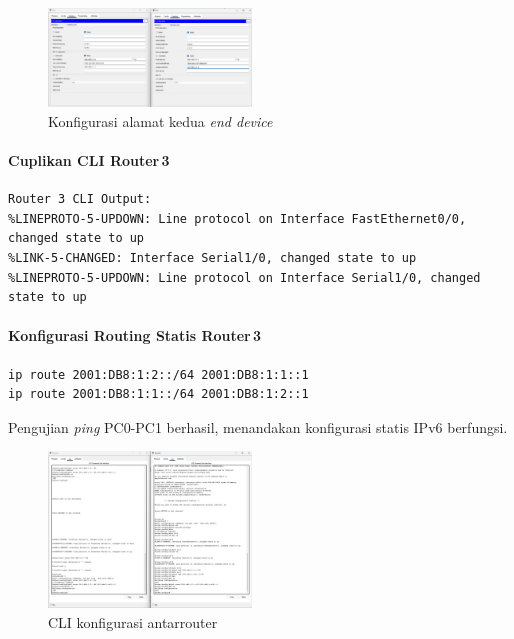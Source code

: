 \begin{figure}[H]
    \centering
    \includegraphics[width=0.48\textwidth]{img/TM2.jpeg}
    \caption{Konfigurasi alamat kedua \textit{end device}}
    \label{fig:tm2}
\end{figure}

\paragraph{Cuplikan CLI Router\,3}
\begin{verbatim}
Router 3 CLI Output:
%LINEPROTO-5-UPDOWN: Line protocol on Interface FastEthernet0/0, changed state to up
%LINK-5-CHANGED: Interface Serial1/0, changed state to up
%LINEPROTO-5-UPDOWN: Line protocol on Interface Serial1/0, changed state to up
\end{verbatim}

\paragraph{Konfigurasi Routing Statis Router\,3}
\begin{verbatim}
ip route 2001:DB8:1:2::/64 2001:DB8:1:1::1
ip route 2001:DB8:1:1::/64 2001:DB8:1:2::1
\end{verbatim}

Pengujian \textit{ping} PC0-PC1 berhasil, menandakan konfigurasi statis IPv6 berfungsi.

\begin{figure}[H]
    \centering
    \includegraphics[width=0.48\textwidth]{img/TM3.jpeg}
    \caption{CLI konfigurasi antarr­outer}
    \label{fig:tm3}
\end{figure}

